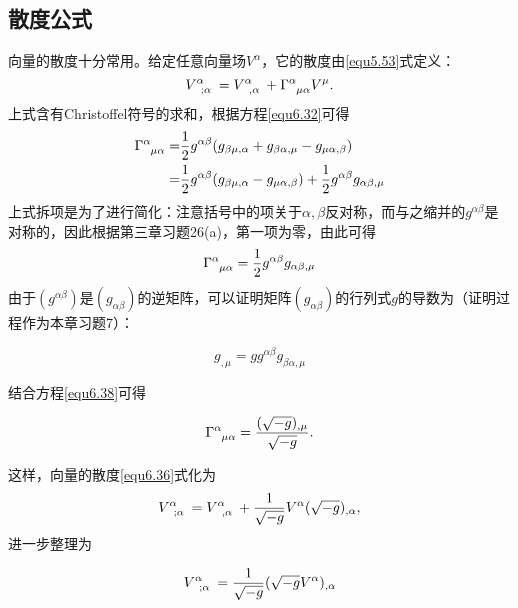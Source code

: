 \subsection*{散度公式}
向量的散度十分常用。给定任意向量场$V^\alpha$，它的散度由\eqref{equ5.53}式定义：
\begin{equation}
    V\indices{^\alpha_{; \alpha}} = V\indices{^\alpha_{, \alpha}} + \Gamma\indices{^\alpha_{\mu \alpha}} V^\mu.
\label{equ6.36}
\end{equation}
上式含有Christoffel符号的求和，根据方程\eqref{equ6.32}可得
\begin{align}
    \Gamma\indices{^\alpha_{\mu \alpha}} =& \frac{1}{2} g^{\alpha \beta} (g_{\beta \mu, \alpha} + g_{\beta \alpha, \mu} - g_{\mu \alpha, \beta}) \notag \\
    =& \frac{1}{2} g^{\alpha \beta} (g_{\beta \mu, \alpha} - g_{\mu \alpha, \beta}) + \frac{1}{2} g^{\alpha \beta} g_{\alpha \beta, \mu} \label{equ6.37}
\end{align}
上式拆项是为了进行简化：注意括号中的项关于$\alpha, \beta$反对称，而与之缩并的$g^{\alpha \beta}$是对称的，因此根据第三章习题26(a)，第一项为零，由此可得
\begin{equation}
    \Gamma\indices{^\alpha_{\mu \alpha}} = \frac{1}{2} g^{\alpha \beta} g_{\alpha \beta, \mu}
\label{equ6.38}
\end{equation}
由于$(g^{\alpha \beta})$是$(g_{\alpha \beta})$的逆矩阵，可以证明矩阵$(g_{\alpha \beta})$的行列式$g$的导数为（证明过程作为本章习题7）：
\begin{shaded}
\begin{equation}
    g_{, \mu} = g g^{\alpha \beta} g_{\beta \alpha, \mu}
\label{equ6.39}
\end{equation}
\end{shaded}
结合方程\eqref{equ6.38}可得
\begin{shaded}
\begin{equation}
    \Gamma\indices{^\alpha_{\mu \alpha}} = \frac{ (\sqrt{-g})_{, \mu} }{ \sqrt{-g} }.
\label{equ6.40}
\end{equation}
\end{shaded}
这样，向量的散度\eqref{equ6.36}式化为
\begin{equation}
    V\indices{^\alpha_{; \alpha}} = V\indices{^\alpha_{, \alpha}} + \frac{1}{\sqrt{-g}} V^\alpha (\sqrt{-g})_{, \alpha},
\label{equ6.41}
\end{equation}
进一步整理为
\begin{shaded}
\begin{equation}
    V\indices{^\alpha_{; \alpha}} = \frac{1}{\sqrt{-g}} (\sqrt{-g} V^\alpha)_{, \alpha}
\label{equ6.42}
\end{equation}
\end{shaded}
